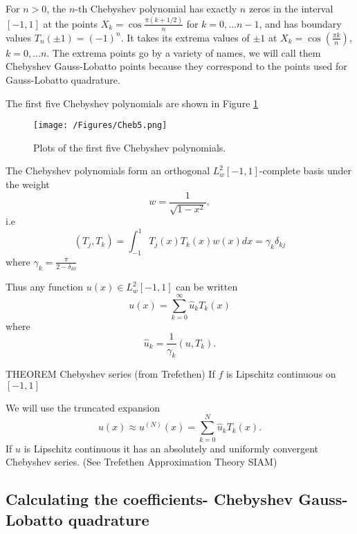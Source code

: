 For $n> 0$, the $n$-th Chebyshev polynomial has exactly $n$ zeros in the interval $[-1,1]$ at the points $X_k=\cos\frac{\pi (k+1/2)}{n}$ for $k=0,...n-1$, and has boundary values $T_n(\pm 1)=(-1)^n$. It takes its extrema values of $\pm 1$ at $X_k=\cos(\frac{\pi k}{n})$, $k=0,...n$. The extrema points go by a variety of names, we will call them Chebyshev Gauss-Lobatto points because they correspond to the points used for Gauss-Lobatto quadrature. 

The first five Chebyshev polynomials are shown in Figure \ref{fig:Cheb5}
\begin{figure}[h]
\caption{Plots of the first five Chebyshev polynomials.}
\label{fig:Cheb5}
\centering
\texttt{[image: /Figures/Cheb5.png]}
\end{figure}

The Chebyshev polynomials form an orthogonal $L^2_w[-1,1]$-complete basis under the weight 
\begin{equation}\label{eq:ChebyWeight} w=\frac{1}{\sqrt{1-x^2}},\end{equation}
i.e
\begin{equation}\label{eq:ChebyOrth} (T_j,T_k)=\int_{-1}^1 T_j(x)T_k(x)w(x)dx=\gamma_k \delta_{kj}\end{equation}
where $\gamma_k = \frac{\pi}{2-\delta_{k0}}$

Thus any function $u(x)\in L^2_w[-1,1]$ can be written
\begin{equation}\label{eq:ChebyExpansion} u(x)=\sum_{k=0}^{\infty} \hat{u}_k T_k(x) \end{equation}
where
\begin{equation}\label{eq:ChebyCoeffs} \hat{u}_k = \frac{1}{\gamma_k}(u,T_k). \end{equation}

THEOREM Chebyshev series (from Trefethen)
If $f$ is Lipschitz continuous on $[-1, 1]$ 

We will use the truncated expansion 
\begin{equation}\label{eq:ChebyExpansionTrunc} u(x)\approx u^{(N)}(x)=\sum_{k=0}^{N} \hat{u}_k T_k(x). \end{equation}
If $u$ is Lipschitz continuous it has an absolutely and uniformly convergent Chebyshev series. (See Trefethen Approximation Theory SIAM)

\subsection{Calculating the coefficients- Chebyshev Gauss-Lobatto quadrature}

